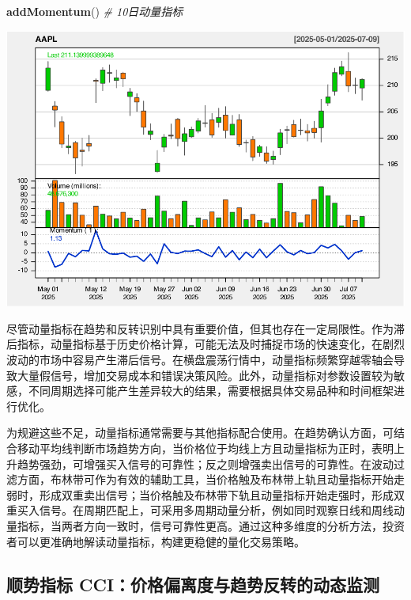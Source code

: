 \documentclass[]{ctexbook}
\newenvironment{Shaded}{\begin{snugshade}}{\end{snugshade}}
\newcommand{\CommentTok}[1]{\textcolor[rgb]{0.56,0.35,0.01}{\textit{#1}}}
\newcommand{\FunctionTok}[1]{\textcolor[rgb]{0.13,0.29,0.53}{\textbf{#1}}}
\newcommand{\NormalTok}[1]{#1}
\begin{document}
\begin{Shaded}
\begin{Highlighting}[]
\FunctionTok{addMomentum}\NormalTok{()  }\CommentTok{\# 10日动量指标}
\end{Highlighting}
\end{Shaded}

\includegraphics[width=0.9\linewidth]{quantmod_files/figure-latex/mom-2}

尽管动量指标在趋势和反转识别中具有重要价值，但其也存在一定局限性。作为滞后指标，动量指标基于历史价格计算，可能无法及时捕捉市场的快速变化，在剧烈波动的市场中容易产生滞后信号。在横盘震荡行情中，动量指标频繁穿越零轴会导致大量假信号，增加交易成本和错误决策风险。此外，动量指标对参数设置较为敏感，不同周期选择可能产生差异较大的结果，需要根据具体交易品种和时间框架进行优化。

为规避这些不足，动量指标通常需要与其他指标配合使用。在趋势确认方面，可结合移动平均线判断市场趋势方向，当价格位于均线上方且动量指标为正时，表明上升趋势强劲，可增强买入信号的可靠性；反之则增强卖出信号的可靠性。在波动过滤方面，布林带可作为有效的辅助工具，当价格触及布林带上轨且动量指标开始走弱时，形成双重卖出信号；当价格触及布林带下轨且动量指标开始走强时，形成双重买入信号。在周期匹配上，可采用多周期动量分析，例如同时观察日线和周线动量指标，当两者方向一致时，信号可靠性更高。通过这种多维度的分析方法，投资者可以更准确地解读动量指标，构建更稳健的量化交易策略。

\subsection{顺势指标 CCI：价格偏离度与趋势反转的动态监测}\label{ux987aux52bfux6307ux6807-cciux4ef7ux683cux504fux79bbux5ea6ux4e0eux8d8bux52bfux53cdux8f6cux7684ux52a8ux6001ux76d1ux6d4b}
\end{document}
